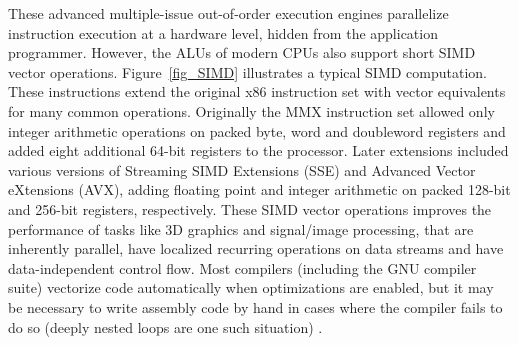 These advanced multiple-issue out-of-order execution engines parallelize instruction execution at a hardware level, hidden from the application programmer. However, the ALUs of modern CPUs also support short 
SIMD vector operations. Figure~\ref{fig_SIMD} illustrates a typical SIMD computation. These instructions extend the original x86 instruction set with vector equivalents for many common operations. Originally
the MMX instruction set allowed only integer arithmetic operations on packed byte, word and doubleword registers and added eight additional 64-bit registers to the processor. Later extensions included 
various versions of Streaming SIMD Extensions (SSE) and Advanced Vector eXtensions (AVX), adding floating point and integer arithmetic on packed 128-bit and 256-bit registers, respectively. These
SIMD vector operations improves the performance of tasks like 3D graphics and signal/image processing, that are inherently parallel, have localized recurring operations on data streams and have data-independent 
control flow. Most compilers (including the GNU compiler suite) vectorize code automatically when optimizations are enabled, but it may be necessary to write assembly code by hand in cases where the compiler fails
to do so (deeply nested loops are one such situation) \cite{intelArch}.
